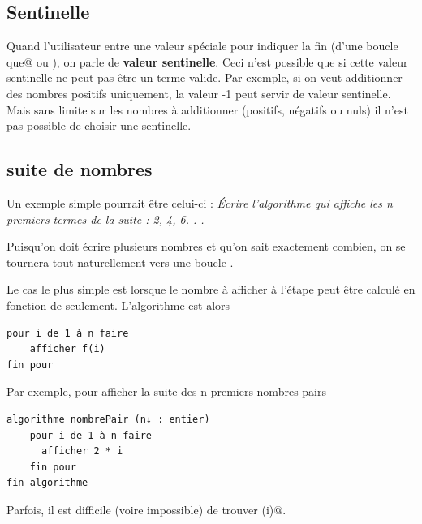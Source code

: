 \documentclass[11pt,a4paper]{article}
\begin{document}
            \par
        \subsection{Sentinelle}
      Quand l'utilisateur entre une valeur sp\'eciale pour indiquer la fin 
      (d'une boucle \verb@tant que@ ou \verb@faire@), 
      on parle de\textbf{ valeur sentinelle}.
      Ceci n'est possible que si cette valeur sentinelle ne peut pas \^etre un terme valide. 
      Par exemple, si on veut additionner des nombres positifs uniquement, la valeur -1 peut
      servir de valeur sentinelle. Mais sans limite sur les nombres \`a additionner (positifs, n\'egatifs
      ou nuls) il n'est pas possible de choisir une sentinelle.
    \subsection{suite de nombres}
		    Un exemple simple pourrait \^etre celui-ci : 
		    \guillemotleft  \textit{\'Ecrire l'algorithme qui affiche les n premiers
        termes de la suite : 2, 4, 6. . . }\guillemotright 
      
            \par
        
        Puisqu'on doit \'ecrire plusieurs nombres et qu'on sait exactement combien, 
        on se tournera tout naturellement vers une boucle \verb@pour@.
      
            \par
        
        Le cas le plus simple est lorsque le nombre \`a afficher \`a l'\'etape \verb@i@ 
        peut \^etre calcul\'e en fonction de \verb@i@ seulement. L'algorithme est alors
      
            \par
        \begin{verbatim}
pour i de 1 à n faire
    afficher f(i)
fin pour
      \end{verbatim}Par exemple, pour afficher la suite des n premiers nombres pairs
            \par
        \begin{verbatim}
algorithme nombrePair (n↓ : entier)
    pour i de 1 à n faire
      afficher 2 * i
    fin pour
fin algorithme
      \end{verbatim}
        Parfois, il est difficile (voire impossible) de trouver \verb@f(i)@.\par
				
\end{document}
